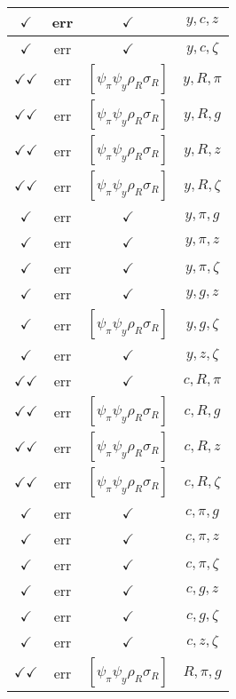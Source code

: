 \documentclass[a4paper,10pt]{article}
\begin{document}
\begin{longtable}{|c|c|c|c|}
\hline
$\checkmark$ & err & $\checkmark$ & ${y},{c},{z}$ \\
\hline
$\checkmark$ & err & $\checkmark$ & ${y},{c},{\zeta}$ \\
\hline
$\checkmark\checkmark$ & err & $[\psi_\pi \psi_y \rho_R \sigma_R ]$ & ${y},{R},{\pi}$ \\
\hline
$\checkmark\checkmark$ & err & $[\psi_\pi \psi_y \rho_R \sigma_R ]$ & ${y},{R},{g}$ \\
\hline
$\checkmark\checkmark$ & err & $[\psi_\pi \psi_y \rho_R \sigma_R ]$ & ${y},{R},{z}$ \\
\hline
$\checkmark\checkmark$ & err & $[\psi_\pi \psi_y \rho_R \sigma_R ]$ & ${y},{R},{\zeta}$ \\
\hline
$\checkmark$ & err & $\checkmark$ & ${y},{\pi},{g}$ \\
\hline
$\checkmark$ & err & $\checkmark$ & ${y},{\pi},{z}$ \\
\hline
$\checkmark$ & err & $\checkmark$ & ${y},{\pi},{\zeta}$ \\
\hline
$\checkmark$ & err & $\checkmark$ & ${y},{g},{z}$ \\
\hline
$\checkmark$ & err & $[\psi_\pi \psi_y \rho_R \sigma_R ]$ & ${y},{g},{\zeta}$ \\
\hline
$\checkmark$ & err & $\checkmark$ & ${y},{z},{\zeta}$ \\
\hline
$\checkmark\checkmark$ & err & $\checkmark$ & ${c},{R},{\pi}$ \\
\hline
$\checkmark\checkmark$ & err & $[\psi_\pi \psi_y \rho_R \sigma_R ]$ & ${c},{R},{g}$ \\
\hline
$\checkmark\checkmark$ & err & $[\psi_\pi \psi_y \rho_R \sigma_R ]$ & ${c},{R},{z}$ \\
\hline
$\checkmark\checkmark$ & err & $[\psi_\pi \psi_y \rho_R \sigma_R ]$ & ${c},{R},{\zeta}$ \\
\hline
$\checkmark$ & err & $\checkmark$ & ${c},{\pi},{g}$ \\
\hline
$\checkmark$ & err & $\checkmark$ & ${c},{\pi},{z}$ \\
\hline
$\checkmark$ & err & $\checkmark$ & ${c},{\pi},{\zeta}$ \\
\hline
$\checkmark$ & err & $\checkmark$ & ${c},{g},{z}$ \\
\hline
$\checkmark$ & err & $\checkmark$ & ${c},{g},{\zeta}$ \\
\hline
$\checkmark$ & err & $\checkmark$ & ${c},{z},{\zeta}$ \\
\hline
$\checkmark\checkmark$ & err & $[\psi_\pi \psi_y \rho_R \sigma_R ]$ & ${R},{\pi},{g}$ \\

\end{longtable}
\end{document}
